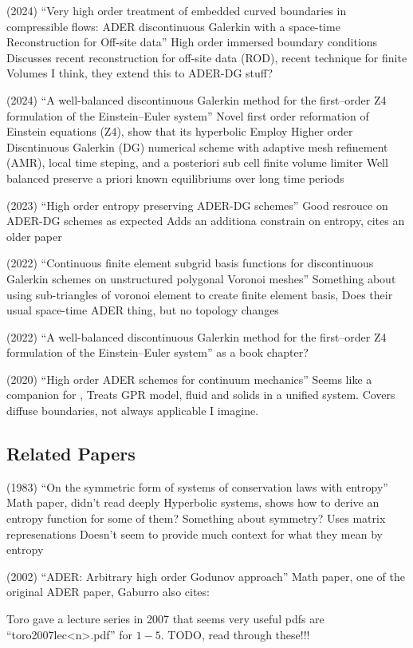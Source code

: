 \begin{outline}
  \1 (2024) ``Very high order treatment of embedded curved boundaries in compressible flows: ADER discontinuous Galerkin with a space-time Reconstruction for Off-site data'' \cite{ciallella2024very}
  \2 High order immersed boundary conditions
  \2 Discusses recent reconstruction for off-site data (ROD), recent technique for finite Volumes
  \2 I think, they extend this to ADER-DG stuff?

  \1 (2024) ``A well-balanced discontinuous Galerkin method for the first--order Z4 formulation of the Einstein--Euler system'' \cite{dumbser2024well}
  \2 Novel first order reformation of Einstein equations (Z4), show that its hyperbolic
  \2 Employ Higher order Discntinuous Galerkin (DG) numerical scheme with adaptive mesh refinement (AMR), local time steping, and a posteriori sub cell finite volume limiter
  \2 Well balanced preserve a priori known equilibriums over long time periods

  \1 (2023) ``High order entropy preserving ADER-DG schemes'' \cite{gaburro2023high}
  \2 Good resrouce on ADER-DG schemes as expected
  \2 Adds an additiona constrain on entropy, cites an older paper \cite{harten1983symmetric} 

  \1 (2022) ``Continuous finite element subgrid basis functions for discontinuous Galerkin schemes on unstructured polygonal Voronoi meshes'' \cite{boscheri2022continuous}
  \2 Something about using sub-triangles of voronoi element to create finite element basis,
  \2 Does their usual space-time ADER thing, but no topology changes

  \1 (2022) ``A well-balanced discontinuous Galerkin method for the first--order Z4 formulation of the Einstein--Euler system'' \cite{Gaburro2021High}
  \2 \cite{Gaburro2020High} as a book chapter?

  \1 (2020) ``High order ADER schemes for continuum mechanics'' \cite{busto2020high}
  \2 Seems like a companion for \cite{Gaburro2020High},
  \2 Treats GPR model, fluid and solids in a unified system.
  \2 Covers diffuse boundaries, not always applicable I imagine.
\end{outline}

\subsection{Related Papers}

\begin{outline}
  \1 (1983) ``On the symmetric form of systems of conservation laws with entropy'' \cite{harten1983symmetric}
  \2 Math paper, didn't read deeply
  \2 Hyperbolic systems, shows how to derive an entropy function for some of them? Something about symmetry? Uses matrix represenations
  \2 Doesn't seem to provide much context for what they mean by entropy

  \1 (2002) ``ADER: Arbitrary high order Godunov approach'' \cite{titarev2002ader}
  \2 Math paper, one of the original ADER paper, Gaburro also cites:

  \1 Toro gave a lecture series in 2007 that seems very useful \cite{toro2007lec} 
  \2 pdfs are ``toro2007lec<n>.pdf'' for $1-5$.
  \2 TODO, read through these!!!
\end{outline}


